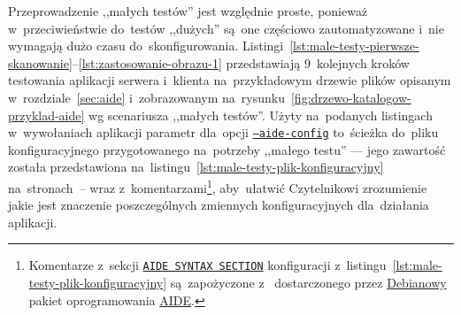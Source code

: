\documentclass[thesis]{subfiles}
\begin{document}
Przeprowadzenie ,,małych testów'' jest względnie proste, ponieważ w~przeciwieństwie do~testów ,,dużych'' są~one częściowo zautomatyzowane i~nie wymagają dużo czasu do~skonfigurowania. Listingi~\ref{lst:male-testy-pierwsze-skanowanie}--\ref{lst:zastosowanie-obrazu-1} przedstawiają 9~kolejnych kroków testowania aplikacji serwera i~klienta na~przykładowym drzewie plików opisanym w~rozdziale~\ref{sec:aide} i~zobrazowanym na~rysunku~\ref{fig:drzewo-katalogow-przyklad-aide} wg scenariusza ,,małych testów''. Użyty na~podanych listingach w~wywołaniach aplikacji \texttt{\srvappname{}} parametr  dla~opcji \hyperlink{itm:aide-config}{\texttt{--aide-config}} to~ścieżka do~pliku konfiguracyjnego przygotowanego na~potrzeby ,,małego testu'' --- jego zawartość została przedstawiona na~listingu~\ref{lst:male-testy-plik-konfiguracyjny} na~stronach~\pageref{lst:male-testy-plik-konfiguracyjny}--\pageref{male-testy-plik-konfiguracyjny-last-page} wraz z~komentarzami\footnote{Komentarze z~sekcji \hyperref[line:aide-syntax-section]{\texttt{AIDE SYNTAX SECTION}} konfiguracji  z~listingu~\ref{lst:male-testy-plik-konfiguracyjny} są~zapożyczone z~  dostarczonego przez \href{https://packages.debian.org/search?keywords=aide}{Debianowy} pakiet oprogramowania \hyperref[sec:aide]{AIDE}.}, aby~ułatwić Czytelnikowi zrozumienie jakie jest znaczenie poszczególnych zmiennych konfiguracyjnych dla~działania aplikacji.
\end{document}
